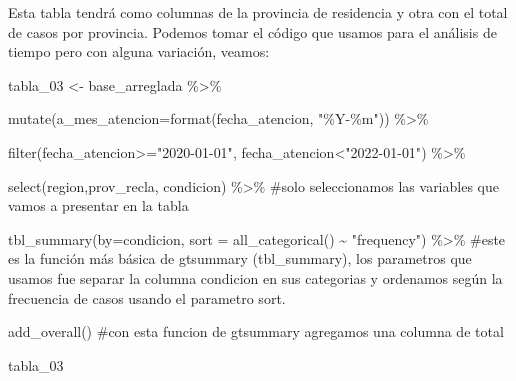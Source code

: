\documentclass[
  letterpaper,
  DIV=11,
  numbers=noendperiod]{scrreprt}
\newenvironment{Shaded}{\begin{snugshade}}{\end{snugshade}}
\newcommand{\AttributeTok}[1]{\textcolor[rgb]{0.40,0.45,0.13}{#1}}
\newcommand{\CommentTok}[1]{\textcolor[rgb]{0.37,0.37,0.37}{#1}}
\newcommand{\FunctionTok}[1]{\textcolor[rgb]{0.28,0.35,0.67}{#1}}
\newcommand{\NormalTok}[1]{\textcolor[rgb]{0.00,0.23,0.31}{#1}}
\newcommand{\OtherTok}[1]{\textcolor[rgb]{0.00,0.23,0.31}{#1}}
\newcommand{\SpecialCharTok}[1]{\textcolor[rgb]{0.37,0.37,0.37}{#1}}
\newcommand{\StringTok}[1]{\textcolor[rgb]{0.13,0.47,0.30}{#1}}
\begin{document}
Esta tabla tendrá como columnas de la provincia de residencia y otra con
el total de casos por provincia. Podemos tomar el código que usamos para
el análisis de tiempo pero con alguna variación, veamos:

\begin{Shaded}
\begin{Highlighting}[]
\NormalTok{tabla\_03 }\OtherTok{\textless{}{-}}\NormalTok{ base\_arreglada }\SpecialCharTok{\%\textgreater{}\%}
  
  \FunctionTok{mutate}\NormalTok{(}\AttributeTok{a\_mes\_atencion=}\FunctionTok{format}\NormalTok{(fecha\_atencion, }\StringTok{"\%Y{-}\%m"}\NormalTok{)) }\SpecialCharTok{\%\textgreater{}\%} 
 
   \FunctionTok{filter}\NormalTok{(fecha\_atencion}\SpecialCharTok{\textgreater{}=}\StringTok{"2020{-}01{-}01"}\NormalTok{, fecha\_atencion}\SpecialCharTok{\textless{}}\StringTok{"2022{-}01{-}01"}\NormalTok{) }\SpecialCharTok{\%\textgreater{}\%} 
  
  \FunctionTok{select}\NormalTok{(region,prov\_recla, condicion) }\SpecialCharTok{\%\textgreater{}\%} \CommentTok{\#solo seleccionamos las variables que vamos a presentar en la tabla}
  
  \FunctionTok{tbl\_summary}\NormalTok{(}\AttributeTok{by=}\NormalTok{condicion, }\AttributeTok{sort =} \FunctionTok{all\_categorical}\NormalTok{() }\SpecialCharTok{\textasciitilde{}} \StringTok{"frequency"}\NormalTok{) }\SpecialCharTok{\%\textgreater{}\%} \CommentTok{\#este es la función más básica de gtsummary (tbl\_summary), los parametros que usamos fue separar la columna condicion en sus categorias y ordenamos según la frecuencia de casos usando el parametro sort.}
  
  \FunctionTok{add\_overall}\NormalTok{() }\CommentTok{\#con esta funcion de gtsummary agregamos una columna de total}

\NormalTok{tabla\_03}
\end{Highlighting}
\end{Shaded}
\end{document}
